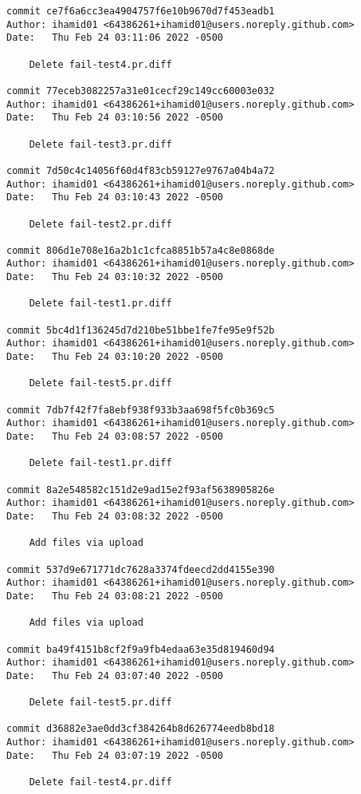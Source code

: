{\begin{verbatim}
commit ce7f6a6cc3ea4904757f6e10b9670d7f453eadb1
Author: ihamid01 <64386261+ihamid01@users.noreply.github.com>
Date:   Thu Feb 24 03:11:06 2022 -0500

    Delete fail-test4.pr.diff

commit 77eceb3082257a31e01cecf29c149cc60003e032
Author: ihamid01 <64386261+ihamid01@users.noreply.github.com>
Date:   Thu Feb 24 03:10:56 2022 -0500

    Delete fail-test3.pr.diff

commit 7d50c4c14056f60d4f83cb59127e9767a04b4a72
Author: ihamid01 <64386261+ihamid01@users.noreply.github.com>
Date:   Thu Feb 24 03:10:43 2022 -0500

    Delete fail-test2.pr.diff

commit 806d1e708e16a2b1c1cfca8851b57a4c8e0868de
Author: ihamid01 <64386261+ihamid01@users.noreply.github.com>
Date:   Thu Feb 24 03:10:32 2022 -0500

    Delete fail-test1.pr.diff

commit 5bc4d1f136245d7d210be51bbe1fe7fe95e9f52b
Author: ihamid01 <64386261+ihamid01@users.noreply.github.com>
Date:   Thu Feb 24 03:10:20 2022 -0500

    Delete fail-test5.pr.diff

commit 7db7f42f7fa8ebf938f933b3aa698f5fc0b369c5
Author: ihamid01 <64386261+ihamid01@users.noreply.github.com>
Date:   Thu Feb 24 03:08:57 2022 -0500

    Delete fail-test1.pr.diff

commit 8a2e548582c151d2e9ad15e2f93af5638905826e
Author: ihamid01 <64386261+ihamid01@users.noreply.github.com>
Date:   Thu Feb 24 03:08:32 2022 -0500

    Add files via upload

commit 537d9e671771dc7628a3374fdeecd2dd4155e390
Author: ihamid01 <64386261+ihamid01@users.noreply.github.com>
Date:   Thu Feb 24 03:08:21 2022 -0500

    Add files via upload

commit ba49f4151b8cf2f9a9fb4edaa63e35d819460d94
Author: ihamid01 <64386261+ihamid01@users.noreply.github.com>
Date:   Thu Feb 24 03:07:40 2022 -0500

    Delete fail-test5.pr.diff

commit d36882e3ae0dd3cf384264b8d626774eedb8bd18
Author: ihamid01 <64386261+ihamid01@users.noreply.github.com>
Date:   Thu Feb 24 03:07:19 2022 -0500

    Delete fail-test4.pr.diff


\end{verbatim}}
